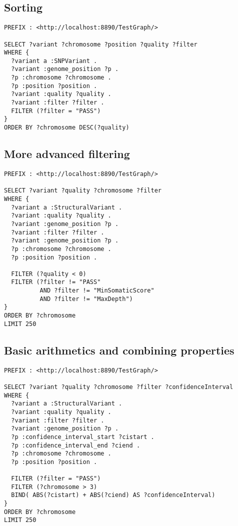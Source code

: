 \documentclass[11pt,a4paper,oneside]{book}
\begin{document}
\subsection{Sorting}

\begin{siderules}
\begin{verbatim}
PREFIX : <http://localhost:8890/TestGraph/>

SELECT ?variant ?chromosome ?position ?quality ?filter
WHERE {
  ?variant a :SNPVariant .
  ?variant :genome_position ?p .
  ?p :chromosome ?chromosome .
  ?p :position ?position .
  ?variant :quality ?quality .
  ?variant :filter ?filter .
  FILTER (?filter = "PASS")
}
ORDER BY ?chromosome DESC(?quality)
\end{verbatim}
\end{siderules}

\subsection{More advanced filtering}

\begin{siderules}
\begin{verbatim}
PREFIX : <http://localhost:8890/TestGraph/>

SELECT ?variant ?quality ?chromosome ?filter
WHERE {
  ?variant a :StructuralVariant .
  ?variant :quality ?quality .
  ?variant :genome_position ?p .
  ?variant :filter ?filter .
  ?variant :genome_position ?p .
  ?p :chromosome ?chromosome .
  ?p :position ?position .

  FILTER (?quality < 0)
  FILTER (?filter != "PASS" 
          AND ?filter != "MinSomaticScore"
          AND ?filter != "MaxDepth")
}
ORDER BY ?chromosome
LIMIT 250
\end{verbatim}
\end{siderules}

\subsection{Basic arithmetics and combining properties}

\begin{siderules}
\begin{verbatim}
PREFIX : <http://localhost:8890/TestGraph/>

SELECT ?variant ?quality ?chromosome ?filter ?confidenceInterval
WHERE {
  ?variant a :StructuralVariant .
  ?variant :quality ?quality .
  ?variant :filter ?filter .
  ?variant :genome_position ?p .
  ?p :confidence_interval_start ?cistart .
  ?p :confidence_interval_end ?ciend .
  ?p :chromosome ?chromosome .
  ?p :position ?position .

  FILTER (?filter = "PASS")
  FILTER (?chromosome > 3)
  BIND( ABS(?cistart) + ABS(?ciend) AS ?confidenceInterval)
}
ORDER BY ?chromosome
LIMIT 250
\end{verbatim}
\end{siderules}
\end{document}
